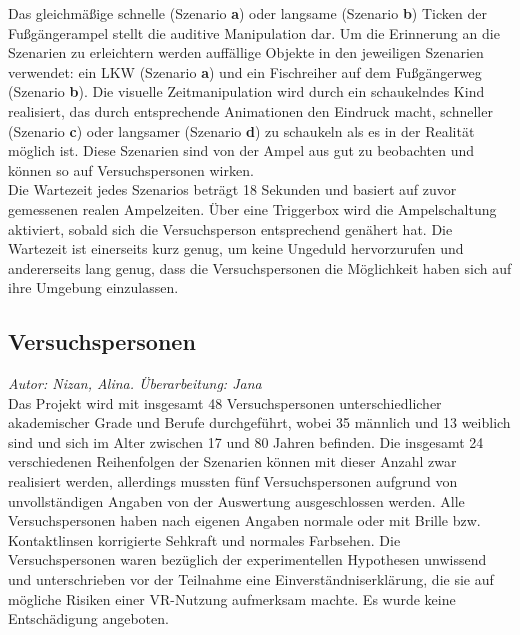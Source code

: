 \documentclass{Paper}
\begin{document}


Das gleichmäßige schnelle (Szenario \textbf{a}) oder langsame (Szenario \textbf{b}) Ticken der Fußgängerampel stellt die auditive Manipulation dar. Um die Erinnerung an die Szenarien zu erleichtern werden auffällige Objekte in den jeweiligen Szenarien verwendet: ein LKW (Szenario \textbf{a}) und ein Fischreiher auf dem Fußgängerweg (Szenario \textbf{b}).
Die visuelle Zeitmanipulation wird durch ein schaukelndes Kind realisiert, das durch entsprechende Animationen den Eindruck macht, schneller (Szenario \textbf{c}) oder langsamer (Szenario \textbf{d}) zu schaukeln als es in der Realität möglich ist. Diese Szenarien sind von der Ampel aus gut zu beobachten und können so auf Versuchspersonen wirken.\\
Die Wartezeit jedes Szenarios beträgt 18 Sekunden und basiert auf zuvor gemessenen realen Ampelzeiten. Über eine Triggerbox wird die Ampelschaltung aktiviert, sobald sich die Versuchsperson entsprechend genähert hat. Die Wartezeit ist einerseits kurz genug, um keine Ungeduld hervorzurufen und andererseits lang genug, dass die Versuchspersonen die Möglichkeit haben sich auf ihre Umgebung einzulassen. 

\subsection{Versuchspersonen}
        \textit{Autor: Nizan, Alina. Überarbeitung: Jana}\\
Das Projekt wird mit insgesamt 48 Versuchspersonen unterschiedlicher akademischer Grade und Berufe  durchgeführt, wobei 35 männlich und 13 weiblich sind und sich im Alter zwischen 17 und 80 Jahren befinden. 
Die insgesamt 24 verschiedenen Reihenfolgen der Szenarien können mit dieser Anzahl zwar realisiert werden, allerdings mussten fünf Versuchspersonen aufgrund von unvollständigen Angaben von der Auswertung ausgeschlossen werden. 
Alle Versuchspersonen haben nach eigenen Angaben normale oder mit Brille bzw. Kontaktlinsen korrigierte Sehkraft und normales Farbsehen. Die Versuchspersonen waren bezüglich der experimentellen Hypothesen unwissend und unterschrieben vor der Teilnahme eine Einverständniserklärung, die sie auf mögliche Risiken einer VR-Nutzung aufmerksam machte. Es wurde keine Entschädigung angeboten. 
\end{document}
